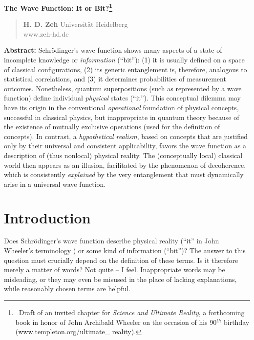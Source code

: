 \documentclass[12pt]{article}
\begin{document}
 

\vspace*{1.5cm}

\noindent
{\LARGE \bf  	The Wave Function: It or Bit?\footnote{\ Draft of
an invited chapter for {\it Science and Ultimate Reality}, a
forthcoming book in honor of John Archibald Wheeler on the occasion of
his 90$^{th}$ birthday (www.templeton.org/ultimate\_ reality).} }

\vskip 1.5cm
\begin{quote}
\noindent
{\bf H. D. Zeh}
\vskip 0.2cm
\noindent
Universit\"at Heidelberg\\
www.zeh-hd.de
\end{quote}
\vskip 1.8cm



{\bf Abstract:} Schr\"odinger's wave function shows many aspects of a
state of incomplete knowledge or {\it information} (``bit''): (1) it
is usually defined on a space of classical configurations, (2) its
generic entanglement is, therefore, analogous to statistical
correlations, and (3) it determines probabilities of measurement
outcomes. Nonetheless, quantum superpositions (such as represented by
a wave function) define individual {\it physical} states
(``it''). This conceptual dilemma may have its origin in the
conventional {\it operational} foundation of physical concepts,
successful in classical physics, but inappropriate in quantum theory
because of the existence of mutually exclusive operations (used for
the definition of concepts). In contrast, a {\it hypothetical
realism}, based on concepts that are justified only by their universal
and consistent applicability, favors the wave function as a
description of (thus nonlocal) physical reality. The (conceptually
local) classical world then appears as an illusion, facilitated by the
phenomenon of decoherence, which is consistently {\it explained} by
the very entanglement that must dynamically arise in a universal wave
function.


\vfill

 
\section{Introduction}
Does Schr\"odinger's wave function describe physical reality (``it''
in John Wheeler's terminology \cite{timeas}) or some kind of
information (``bit'')? The answer to this question must crucially
depend on the definition of these terms. Is it therefore merely a
matter of words? Not quite -- I feel. Inappropriate words may be
misleading, or they may even be misused in the place of lacking
explanations, while reasonably chosen terms are helpful.
\end{document}
